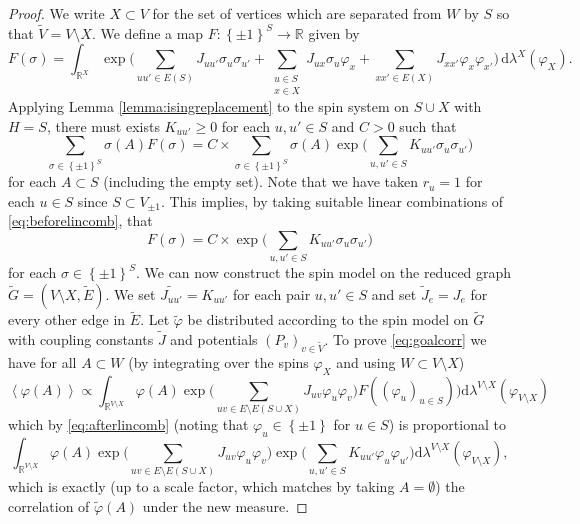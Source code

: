\documentclass{article}
\numberwithin{equation}{section}
\theoremstyle{definition}
\theoremstyle{definition}
\theoremstyle{remark}
\renewcommand{\d}{\mathrm{d}}
\newcommand\vp{\varphi}
\newcommand\R{\mathbb{R}}
\renewcommand{\d}{\mathrm{d}}
\renewcommand{\l}{\lambda}
\newcommand{\Vis}{V_{\mathrm{Ising}}}
\renewcommand{\Vis}{V_{\pm 1}}
\begin{document}
\begin{proof}
	We write $X \subset V$ for the set of vertices which are separated from $W$ by $S$ so that $ \widetilde{V} = V \setminus X$. 
	We define a map $F : \left\{ \pm 1 \right\}^S \to \R$ given by
	\begin{equation}\label{eq:Fmap}
		F(\sigma) = \int_{\R^X} \exp\Big( \sum_{uu' \in E(S)} J_{uu'} \sigma_u \sigma_{u'} + \sum_{\substack{u \in S \\ x \in X}} J_{ux} \sigma_u \vp_x +\sum_{xx' \in E(X)} J_{xx'} \vp_x \vp_{x'}\Big) \, \d\l^X(\vp_X).
	\end{equation}
	Applying Lemma \ref{lemma:isingreplacement} to the spin system on $S \cup X$ with $H = S$, there must exists $ K_{uu'} \geq 0$ for each $u,u' \in S$ and $C > 0$ such that
	\begin{equation}\label{eq:beforelincomb}
		\sum_{\sigma \in \left\{ \pm 1 \right\}^S} \sigma(A) F(\sigma) = C \times \sum_{\sigma \in \left\{ \pm 1 \right\}^S} \sigma(A) \exp\Big(\sum_{u,u' \in S} K_{uu'} \sigma_u \sigma_{u'}\Big)  
	\end{equation} 
	for each $A \subset S$ (including the empty set). 
	Note that we have taken $r_u = 1$ for each $u \in S$ since $S \subset \Vis$. 
	This implies, by taking suitable linear combinations of \eqref{eq:beforelincomb}, that
	\begin{equation}\label{eq:afterlincomb}
		F(\sigma) = C \times \exp\Big(\sum_{u,u' \in S} K_{uu'} \sigma_u \sigma_{u'}\Big)
	\end{equation} 
	for each $\sigma \in \left\{ \pm 1 \right\}^S$.
	\noindent
	We can now construct the spin model on the reduced graph $ \widetilde{G} = ( V \setminus X, \widetilde{E})$. We set $ \widetilde{J_{uu'}} = K_{uu'}$ for each pair $u,u' \in S$ and set $ \widetilde{J}_{e} = J_{e} $ for every other edge in $\widetilde{E}$. Let $\widetilde{\vp}$ be distributed according to the spin model on $ \widetilde{G}$ with coupling constants $ \widetilde{J}$ and potentials $( P_v)_{v \in \widetilde{V}}$. To prove \eqref{eq:goalcorr} we have for all $A \subset W$ (by integrating over the spins $\vp_X$ and using $W \subset V \setminus X$)
	\[
		\left< \vp(A) \right> \propto \int_{\R^{ V \setminus X}} \vp\left( A \right) \exp\Big(\sum_{uv \in E \setminus E(S \cup X)} J_{uv} \vp_u \vp_v\Big) F((\vp_u)_{u \in S})) \d \l^{V \setminus X}(\vp_{V \setminus X})
\]
which by \eqref{eq:afterlincomb} (noting that $\vp_u \in \left\{ \pm 1 \right\}$ for $u \in S$) is proportional to
	\[
		\int_{\R^{V \setminus X}} \vp\left( A \right) \exp\Big(\sum_{uv \in E \setminus E(S \cup X)} J_{uv} \vp_u \vp_v\Big) \exp\Big(  \sum_{u,u' \in S} K_{uu'} \vp_u \vp_{u'}\Big)  \d \l^{V \setminus X}(\vp_{V \setminus X}),
\]
which is exactly (up to a scale factor, which matches by taking $A = \emptyset$) the correlation of $ \widetilde{\vp}(A)$ under the new measure. 
\end{proof}
\end{document}
